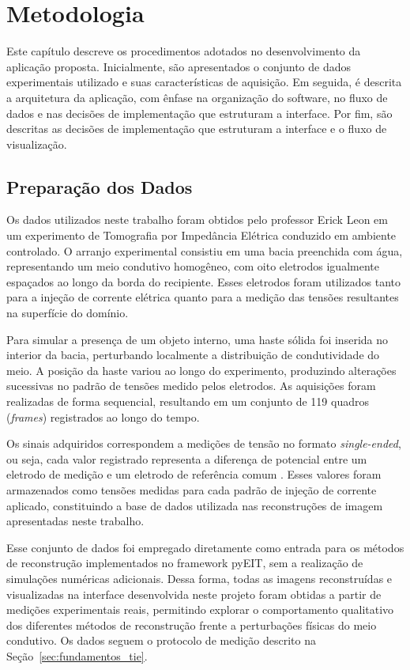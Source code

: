 
\chapter{Metodologia}

Este capítulo descreve os procedimentos adotados no desenvolvimento da aplicação proposta. Inicialmente, são apresentados o conjunto de dados experimentais utilizado e suas características de aquisição. Em seguida, é descrita a arquitetura da aplicação, com ênfase na organização do software, no fluxo de dados e nas decisões de implementação que estruturam a interface. Por fim, são descritas as decisões de implementação que estruturam a interface e o fluxo de visualização.

\section{Preparação dos Dados}
\label{sec:preparacao_dados}

Os dados utilizados neste trabalho foram obtidos pelo professor Erick Leon em um experimento de Tomografia por Impedância Elétrica conduzido em ambiente controlado. O arranjo experimental consistiu em uma bacia preenchida com água, representando um meio condutivo homogêneo, com oito eletrodos igualmente espaçados ao longo da borda do recipiente. Esses eletrodos foram utilizados tanto para a injeção de corrente elétrica quanto para a medição das tensões resultantes na superfície do domínio.

Para simular a presença de um objeto interno, uma haste sólida foi inserida no interior da bacia, perturbando localmente a distribuição de condutividade do meio. A posição da haste variou ao longo do experimento, produzindo alterações sucessivas no padrão de tensões medido pelos eletrodos. As aquisições foram realizadas de forma sequencial, resultando em um conjunto de 119 quadros (\textit{frames}) registrados ao longo do tempo.

Os sinais adquiridos correspondem a medições de tensão no formato \textit{single-ended}, ou seja, cada valor registrado representa a diferença de potencial entre um eletrodo de medição e um eletrodo de referência comum \cite{AdlerHolder2021}. Esses valores foram armazenados como tensões medidas para cada padrão de injeção de corrente aplicado, constituindo a base de dados utilizada nas reconstruções de imagem apresentadas neste trabalho.

Esse conjunto de dados foi empregado diretamente como entrada para os métodos de reconstrução implementados no framework pyEIT, sem a realização de simulações numéricas adicionais. Dessa forma, todas as imagens reconstruídas e visualizadas na interface desenvolvida neste projeto foram obtidas a partir de medições experimentais reais, permitindo explorar o comportamento qualitativo dos diferentes métodos de reconstrução frente a perturbações físicas do meio condutivo. Os dados seguem o protocolo de medição descrito na Seção~\ref{sec:fundamentos_tie}.

